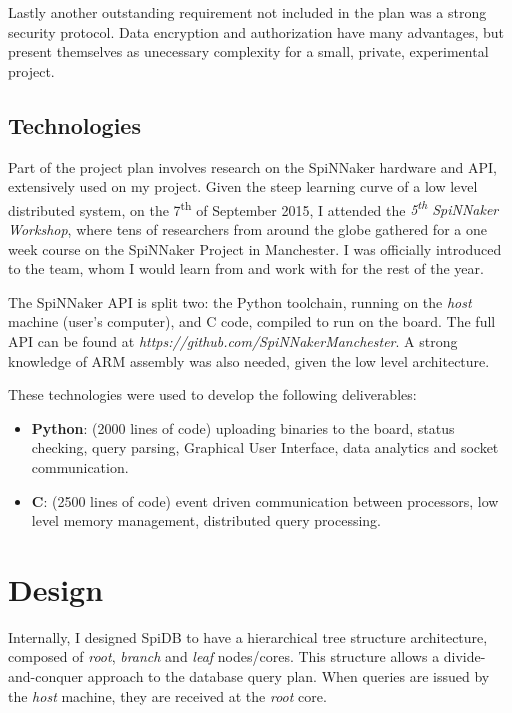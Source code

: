 Lastly another outstanding requirement not included in the plan was a strong security protocol. Data encryption and authorization have many advantages, but present themselves as unecessary complexity for a small, private, experimental project.

\subsection{Technologies}
Part of the project plan involves research on the SpiNNaker hardware and API, extensively used on my project. Given the steep learning curve of a low level distributed system, on the 7\textsuperscript{th} of September 2015, I attended the \textit{5\textsuperscript{th} SpiNNaker Workshop}, where tens of researchers from around the globe gathered for a one week course on the SpiNNaker Project in Manchester. I was officially introduced to the team, whom I would learn from and work with for the rest of the year.

The SpiNNaker API is split two: the Python toolchain, running on the \textit{host} machine (user's computer), and C code, compiled to run on the board. The full API can be found at \textit{https://github.com/SpiNNakerManchester}. A strong knowledge of ARM assembly was also needed, given the low level architecture.

These technologies were used to develop the following deliverables:
\begin{itemize}
	\item \textbf{Python}: (2000 lines of code) uploading binaries to the board, status checking, query parsing, Graphical User Interface, data analytics and socket communication.
	\item \textbf{C}: (2500 lines of code) event driven communication between processors, low level memory management, distributed query processing.
\end{itemize}

\section{Design}
Internally, I designed SpiDB to have a hierarchical tree structure architecture, composed of \textit{root}, \textit{branch} and \textit{leaf} nodes/cores. This structure allows a divide-and-conquer approach to the database query plan. When queries are issued by the \textit{host} machine, they are received at the \textit{root} core.

